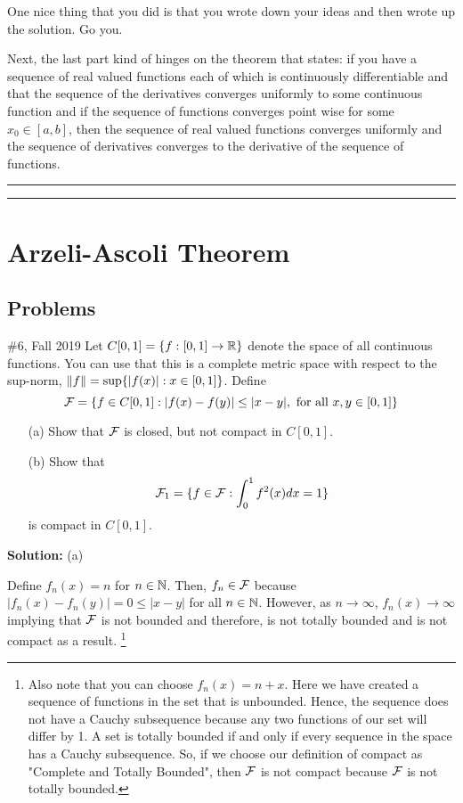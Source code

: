 \documentclass{article}
\begin{document}
One nice thing that you did is that you wrote down your ideas and then wrote up the solution. Go you.

Next, the last part kind of hinges on the theorem that states: if you have a sequence of real valued functions each of which is continuously differentiable and that the sequence of the derivatives converges uniformly to some continuous function and if the sequence of functions converges point wise for some $x_0\in [a,b]$, then the sequence of real valued functions converges uniformly and the sequence of derivatives converges to the derivative of the sequence of functions.\\

\hrule\vspace{2pt}
\hrule

\break

\section{Arzeli-Ascoli Theorem}

\subsection{Problems}

\begin{problem}{\#6, Fall 2019} Let $C[0,1] = \{f: [0,1]\to\mathbb R\}$ denote the space of all continuous functions. You can use that this is a complete metric space with respect to the sup-norm, $\left\lVert {f} \right\rVert = \sup\{|f(x)|: x\in[0,1]\}$. Define
	\[ \mathcal F = \{ f\in C[0,1] : |f(x) - f(y)| \leq |x-y|, \text{ for all } x,y\in[0,1]\}\]
\begin{enumerate}
	\item[(a)] Show that $\mathcal F$ is closed, but not compact in $C[0,1]$.
	\item[(b)] Show that 
		\[ \mathcal F_1 = \{ f\in \mathcal F : \int_0^1 f^2(x) dx = 1\} \]
	is compact in $C[0,1]$.
\end{enumerate}
\end{problem}

\textbf{Solution:} (a) 

Define $f_n(x) = n$ for $n\in \mathbb N$. Then, $f_n\in \mathcal F$ because $|f_n(x) - f_n(y)| = 0 \leq |x-y|$ for all $n\in \mathbb N$. However, as $n\to\infty$, $f_n(x) \to \infty$ implying that $\mathcal F$ is not bounded and therefore, is not totally bounded and is not compact as a result. \footnote{Also note that you can choose $f_n(x) = n+x$. Here we have created a sequence of functions in the set that is unbounded. Hence, the sequence does not have a Cauchy subsequence because any two functions of our set will differ by 1. A set is totally bounded if and only if every sequence in the space has a Cauchy subsequence. So, if we choose our definition of compact as "Complete and Totally Bounded", then $\mathcal F$ is not compact because $\mathcal F$ is not totally bounded.}
\end{document}
